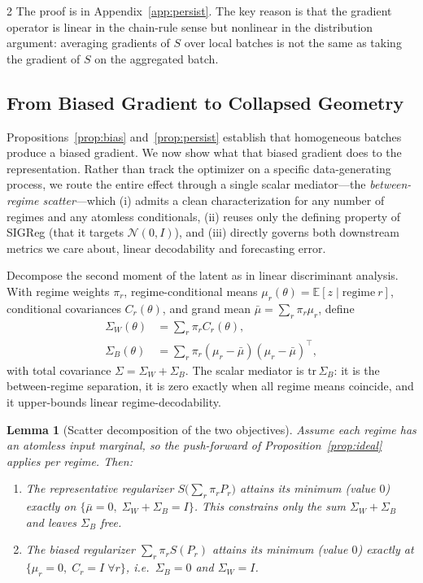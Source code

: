 \documentclass[10pt]{article}
\newtheorem{lemma}{Lemma}
\theoremstyle{remark}
\begin{document}
\begin{multicols*}{2}
The proof is in Appendix~\ref{app:persist}. The key reason is that the gradient operator is linear in the chain-rule sense but nonlinear in the distribution argument: averaging gradients of $S$ over local batches is not the same as taking the gradient of $S$ on the aggregated batch.

\subsection{From Biased Gradient to Collapsed Geometry}
\label{sec:scatter}

Propositions~\ref{prop:bias} and~\ref{prop:persist} establish that homogeneous batches produce a biased gradient. We now show what that biased gradient does to the representation. Rather than track the optimizer on a specific data-generating process, we route the entire effect through a single scalar mediator---the \emph{between-regime scatter}---which (i) admits a clean characterization for any number of regimes and any atomless conditionals, (ii) reuses only the defining property of SIGReg (that it targets $\mathcal{N}(0,I)$), and (iii) directly governs both downstream metrics we care about, linear decodability and forecasting error.

Decompose the second moment of the latent as in linear discriminant analysis. With regime weights $\pi_r$, regime-conditional means $\mu_r(\theta) = \mathbb{E}[z \mid \mathrm{regime}~r]$, conditional covariances $C_r(\theta)$, and grand mean $\bar{\mu} = \sum_r \pi_r \mu_r$, define
\[
\begin{aligned}
\Sigma_W(\theta) &= \textstyle\sum_r \pi_r C_r(\theta), \\
\Sigma_B(\theta) &= \textstyle\sum_r \pi_r (\mu_r - \bar{\mu})(\mu_r - \bar{\mu})^\top,
\end{aligned}
\]
with total covariance $\Sigma = \Sigma_W + \Sigma_B$. The scalar mediator is $\mathrm{tr}\,\Sigma_B$: it is the between-regime separation, it is zero exactly when all regime means coincide, and it upper-bounds linear regime-decodability.

\begin{lemma}[Scatter decomposition of the two objectives]
\label{lem:scatter}
Assume each regime has an atomless input marginal, so the push-forward of Proposition~\ref{prop:ideal} applies per regime. Then:
\begin{enumerate}[leftmargin=*]
    \item The \emph{representative} regularizer $S\bigl(\sum_r \pi_r P_r\bigr)$ attains its minimum (value $0$) exactly on $\{\bar{\mu} = 0,\; \Sigma_W + \Sigma_B = I\}$. This constrains only the sum $\Sigma_W + \Sigma_B$ and leaves $\Sigma_B$ free.
    \item The \emph{biased} regularizer $\sum_r \pi_r S(P_r)$ attains its minimum (value $0$) exactly at $\{\mu_r = 0,\; C_r = I \;\forall r\}$, i.e.\ $\Sigma_B = 0$ and $\Sigma_W = I$.
\end{enumerate}
\end{lemma}


\end{multicols*}
\end{document}
